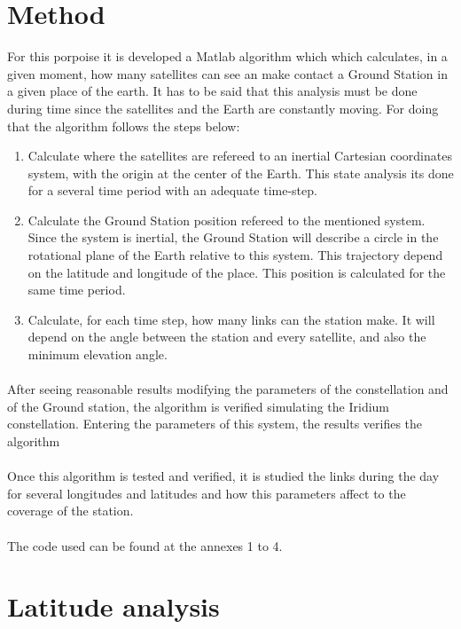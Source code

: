 \documentclass[12pt,a4paper]{report}
\begin{document}
\section{Method}
For this porpoise it is developed a Matlab algorithm which which calculates, in a given moment, how many satellites can see an make contact a Ground Station in a given place of the earth. It has to be said that this analysis must be done during time since the satellites and the Earth are constantly moving. For doing that the algorithm follows the steps below:
\begin{enumerate}
\item Calculate where the satellites are refereed to an inertial Cartesian coordinates system, with the origin at the center of the Earth. This state analysis its done for a several time period with an adequate time-step. 
\item Calculate the Ground Station position refereed to the mentioned system. Since the system is inertial, the Ground Station will describe a circle in the rotational plane of the Earth relative to this system. This trajectory depend on the latitude and longitude of the place. This position is calculated for the same time period.
\item Calculate, for each time step, how many links can the station make. It will depend on the angle between the station and every satellite, and also the minimum elevation angle. 
\end{enumerate}
\paragraph{}
After seeing reasonable results modifying the parameters of the constellation and of the Ground station, the algorithm is verified simulating the Iridium constellation. Entering the parameters of this system, the results verifies the algorithm
\paragraph{}
Once this algorithm is tested and verified, it is studied the links during the day for several longitudes and latitudes and how this parameters affect to the coverage of the station.
\paragraph{}
The code used can be found at the annexes 1 to 4.

\section{Latitude analysis}
\end{document}
